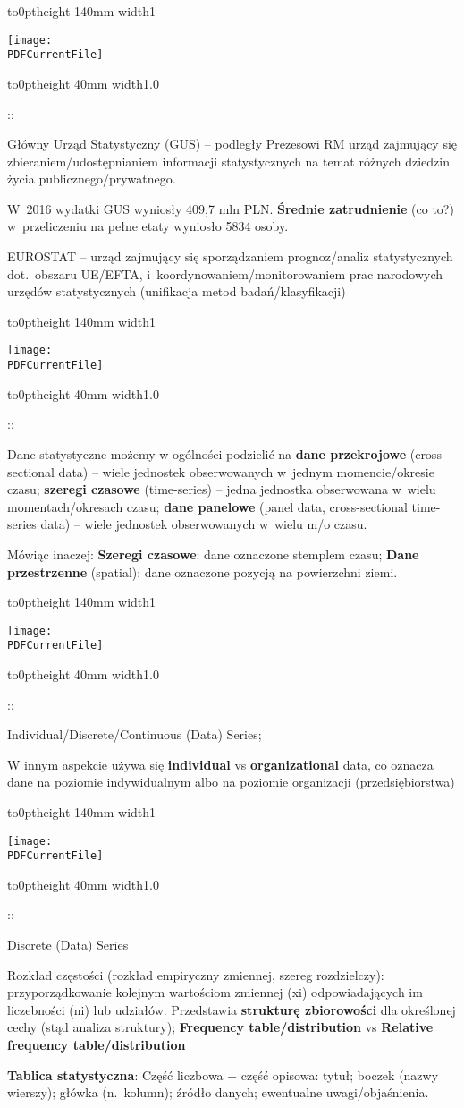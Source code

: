 \documentclass{article}
\def \PDFCurrentFile{stat_w_03.pdf}
\newenvironment{slide}[1]{%
  {\color{green}\vbox to0pt{\noindent \vrule height 140mm width1\textwidth\vss}}
  \vspace{3mm}%
\noindent%
\begin{minipage}{.9\textwidth}
\texttt{[image: \\PDFCurrentFile]}
\end{minipage}%
\par
{\color{orange}\vbox to0pt{\noindent \vrule height 40mm width1.0\textwidth\vss}}
\begin{minipage}{.9\textwidth}
  \thepage::\par
}{\end{minipage}\par
\clearpage}
\begin{document}
\begin{slide}{4}

Główny Urząd Statystyczny (GUS) – 
podległy Prezesowi RM urząd 
zajmujący się zbieraniem/udostępnianiem informacji statystycznych na temat różnych
dziedzin życia publicznego/prywatnego.

W~2016 wydatki GUS wyniosły 409,7 mln PLN. \textbf{Średnie zatrudnienie} (co to?)
w przeliczeniu na pełne etaty wyniosło 5834 osoby.

EUROSTAT -- urząd zajmujący się sporządzaniem prognoz/analiz statystycznych dot.~obszaru UE/EFTA,
i~koordynowaniem/monitorowaniem prac narodowych urzędów statystycznych
(unifikacja metod badań/klasyfikacji)
  
\end{slide}

\begin{slide}{5}
Dane statystyczne możemy w ogólności podzielić na \textbf{dane
  przekrojowe} (cross-sectional data) -- wiele jednostek obserwowanych
w~jednym momencie/okresie czasu; \textbf{szeregi czasowe}
(time-series) -- jedna jednostka obserwowana w~wielu
momentach/okresach czasu; \textbf{dane panelowe} (panel data,
cross-sectional time-series data) -- wiele jednostek obserwowanych
w~wielu m/o czasu.

Mówiąc inaczej:
\textbf{Szeregi czasowe}: dane oznaczone stemplem czasu;
\textbf{Dane przestrzenne} (spatial): dane oznaczone pozycją na powierzchni ziemi.
  
\end{slide}

\begin{slide}{6}
  Individual/Discrete/Continuous (Data) Series;
  
  W innym aspekcie używa się \textbf{individual} vs \textbf{organizational} data, co oznacza dane na poziomie
  indywidualnym albo na poziomie organizacji (przedsiębiorstwa)
\end{slide}

\begin{slide}{7}
  Discrete (Data) Series

  Rozkład częstości (rozkład empiryczny zmiennej, szereg rozdzielczy):
  przyporządkowanie kolejnym wartościom zmiennej (xi) odpowiadających
  im liczebności (ni) lub udziałów.  Przedstawia \textbf{strukturę
  zbiorowości} dla określonej cechy (stąd analiza struktury);
  \textbf{Frequency table/distribution} vs \textbf{Relative frequency table/distribution}
    
\textbf{Tablica statystyczna}: Część liczbowa + część opisowa: tytuł; boczek (nazwy
wierszy); główka (n.~kolumn); źródło danych; ewentualne uwagi/objaśnienia.

\end{slide}
\end{document}
